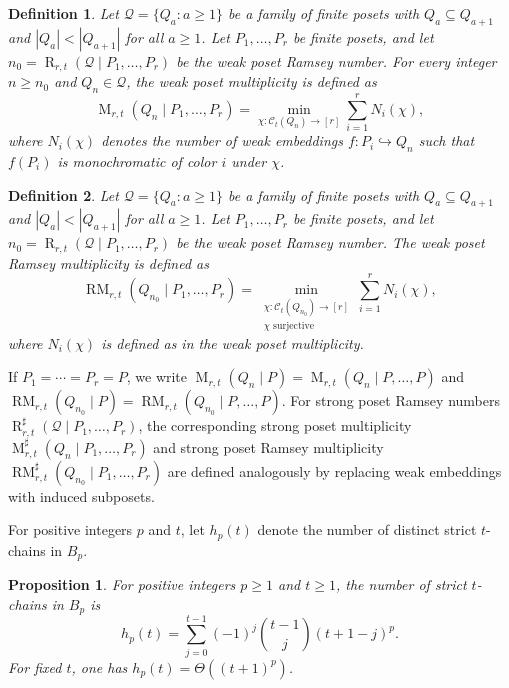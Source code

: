\documentclass[twoside,12pt]{article}
\newtheorem{definition}{Definition}[section]
\newtheorem{proposition}{Proposition}[section]
\begin{document}
\begin{definition}
Let $\mathcal Q=\{Q_a:a\geq1\}$ be a family of finite posets with $Q_a\subseteq Q_{a+1}$ and $|Q_a|<|Q_{a+1}|$ for all $a\geq1$. Let $P_1,\dots,P_r$ be finite posets, and let $n_0=\operatorname R_{r,t}(\mathcal Q\mid P_1,\dots,P_r)$ be the weak poset Ramsey number. For every integer $n\geq n_0$ and $Q_n\in\mathcal Q$, the \emph{weak poset multiplicity} is defined as
\[
\operatorname M_{r,t}(Q_n\mid P_1,\dots,P_r)=\min_{\chi:\mathcal C_t(Q_n)\to[r]}\sum_{i=1}^r N_i(\chi),
\]
where $N_i(\chi)$ denotes the number of weak embeddings $f:P_i\hookrightarrow Q_n$ such that $f(P_i)$ is monochromatic of color $i$ under $\chi$.
\end{definition}

\begin{definition}
Let $\mathcal Q=\{Q_a:a\geq1\}$ be a family of finite posets with $Q_a\subseteq Q_{a+1}$ and $|Q_a|<|Q_{a+1}|$ for all $a\geq1$. Let $P_1,\dots,P_r$ be finite posets, and let $n_0=\operatorname R_{r,t}(\mathcal Q\mid P_1,\dots,P_r)$ be the weak poset Ramsey number. The \emph{weak poset Ramsey multiplicity} is defined as
\[
\operatorname{RM}_{r,t}(Q_{n_0}\mid P_1,\dots,P_r)=\min_{\substack{\chi:\mathcal C_t(Q_{n_0})\to[r]\\ \chi\text{ surjective}}}\sum_{i=1}^r N_i(\chi),
\]
where $N_i(\chi)$ is defined as in the weak poset multiplicity.
\end{definition}

If $P_1=\cdots=P_r=P$, we write $\operatorname M_{r,t}(Q_n\mid P)=\operatorname M_{r,t}(Q_n\mid P,\dots,P)$ and $\operatorname{RM}_{r,t}(Q_{n_0}\mid P)=\operatorname{RM}_{r,t}(Q_{n_0}\mid P,\dots,P)$. For strong poset Ramsey numbers $\operatorname R_{r,t}^{\sharp}(\mathcal Q\mid P_1,\dots,P_r)$, the corresponding strong poset multiplicity $\operatorname M_{r,t}^{\sharp}(Q_n\mid P_1,\dots,P_r)$ and strong poset Ramsey multiplicity $\operatorname{RM}_{r,t}^{\sharp}(Q_{n_0}\mid P_1,\dots,P_r)$ are defined analogously by replacing weak embeddings with induced subposets.

For positive integers $p$ and $t$, let $h_p(t)$ denote the number of distinct strict $t$-chains in $B_p$.

\begin{proposition}{\upshape \cite{KMOW25}}\label{th-La2-corrected}
For positive integers $p\geq1$ and $t\geq1$, the number of strict $t$-chains in $B_p$ is
\begin{equation}\label{eq-bl-hp-def-corrected}
h_p(t)=\sum_{j=0}^{t-1}(-1)^j\binom{t-1}{j}(t+1-j)^p.
\end{equation}
For fixed $t$, one has $h_p(t)=\Theta((t+1)^p)$.
\end{proposition}
\end{document}
